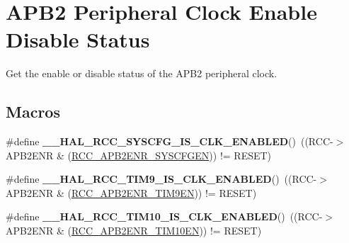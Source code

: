 \hypertarget{group___r_c_c___a_p_b2___peripheral___clock___enable___disable___status}{\section{A\-P\-B2 Peripheral Clock Enable Disable Status}
\label{group___r_c_c___a_p_b2___peripheral___clock___enable___disable___status}
}


Get the enable or disable status of the A\-P\-B2 peripheral clock.  


\subsection*{Macros}
\begin{DoxyCompactItemize}
\item 
\hypertarget{group___r_c_c___a_p_b2___peripheral___clock___enable___disable___status_gad1ea95d1d5f3a2ecf2b903c4ed22e7c6}{\#define {\bfseries \-\_\-\-\_\-\-H\-A\-L\-\_\-\-R\-C\-C\-\_\-\-S\-Y\-S\-C\-F\-G\-\_\-\-I\-S\-\_\-\-C\-L\-K\-\_\-\-E\-N\-A\-B\-L\-E\-D}()~((R\-C\-C-\/$>$A\-P\-B2\-E\-N\-R \& (\hyperlink{group___peripheral___registers___bits___definition_ga7a9d56a8aa1fa0f519ecbdf0d19dd4da}{R\-C\-C\-\_\-\-A\-P\-B2\-E\-N\-R\-\_\-\-S\-Y\-S\-C\-F\-G\-E\-N})) != R\-E\-S\-E\-T)}\label{group___r_c_c___a_p_b2___peripheral___clock___enable___disable___status_gad1ea95d1d5f3a2ecf2b903c4ed22e7c6}

\item 
\hypertarget{group___r_c_c___a_p_b2___peripheral___clock___enable___disable___status_gafab635405d33757b42a3df0d89416e8a}{\#define {\bfseries \-\_\-\-\_\-\-H\-A\-L\-\_\-\-R\-C\-C\-\_\-\-T\-I\-M9\-\_\-\-I\-S\-\_\-\-C\-L\-K\-\_\-\-E\-N\-A\-B\-L\-E\-D}()~((R\-C\-C-\/$>$A\-P\-B2\-E\-N\-R \& (\hyperlink{group___peripheral___registers___bits___definition_ga987ebd8255dc8f9c09127e1d608d1065}{R\-C\-C\-\_\-\-A\-P\-B2\-E\-N\-R\-\_\-\-T\-I\-M9\-E\-N})) != R\-E\-S\-E\-T)}\label{group___r_c_c___a_p_b2___peripheral___clock___enable___disable___status_gafab635405d33757b42a3df0d89416e8a}

\item 
\hypertarget{group___r_c_c___a_p_b2___peripheral___clock___enable___disable___status_ga7a4890d9368f8ea8c87c64d48f09686d}{\#define {\bfseries \-\_\-\-\_\-\-H\-A\-L\-\_\-\-R\-C\-C\-\_\-\-T\-I\-M10\-\_\-\-I\-S\-\_\-\-C\-L\-K\-\_\-\-E\-N\-A\-B\-L\-E\-D}()~((R\-C\-C-\/$>$A\-P\-B2\-E\-N\-R \& (\hyperlink{group___peripheral___registers___bits___definition_gaa98e28e157787e24b93af95273ab3055}{R\-C\-C\-\_\-\-A\-P\-B2\-E\-N\-R\-\_\-\-T\-I\-M10\-E\-N})) != R\-E\-S\-E\-T)}\label{group___r_c_c___a_p_b2___peripheral___clock___enable___disable___status_ga7a4890d9368f8ea8c87c64d48f09686d}


\end{DoxyCompactItemize}
